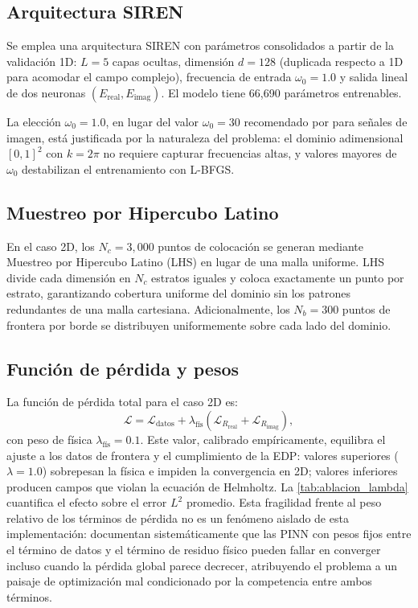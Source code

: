 \subsection{Arquitectura SIREN}
\label{subsec:arquitectura}

Se emplea una arquitectura SIREN con parámetros consolidados a partir de la validación 1D:
$L = 5$ capas ocultas, dimensión $d = 128$ (duplicada respecto a 1D para acomodar el
campo complejo), frecuencia de entrada $\omega_0 = 1.0$ y salida lineal de dos
neuronas $(E_{\mathrm{real}}, E_{\mathrm{imag}})$.
El modelo tiene 66{,}690 parámetros entrenables.

La elección $\omega_0 = 1.0$, en lugar del valor $\omega_0 = 30$ recomendado por
\citet{Sitzmann2020_SIREN} para señales de imagen, está justificada por la naturaleza
del problema: el dominio adimensional $[0,1]^2$ con $k = 2\pi$ no requiere capturar
frecuencias altas, y valores mayores de $\omega_0$ destabilizan el entrenamiento con
L-BFGS.

\subsection{Muestreo por Hipercubo Latino}
\label{subsec:lhs}

En el caso 2D, los $N_c = 3{,}000$ puntos de colocación se generan mediante
Muestreo por Hipercubo Latino (LHS) \citep{Mckay1979_LHS} en lugar de una malla
uniforme.
LHS divide cada dimensión en $N_c$ estratos iguales y coloca exactamente un punto
por estrato, garantizando cobertura uniforme del dominio sin los patrones redundantes
de una malla cartesiana.
Adicionalmente, los $N_b = 300$ puntos de frontera por borde se distribuyen
uniformemente sobre cada lado del dominio.

\subsection{Función de pérdida y pesos}
\label{subsec:loss}

La función de pérdida total para el caso 2D es:
%
\begin{equation}
  \mathcal{L} = \mathcal{L}_{\mathrm{datos}}
              + \lambda_{\mathrm{fís}}\!\left(
                  \mathcal{L}_{R_{\mathrm{real}}} + \mathcal{L}_{R_{\mathrm{imag}}}
                \right),
  \label{eq:loss_2d}
\end{equation}
%
con peso de física $\lambda_{\mathrm{fís}} = 0.1$.
Este valor, calibrado empíricamente, equilibra el ajuste a los datos de frontera y
el cumplimiento de la EDP: valores superiores ($\lambda = 1.0$) sobrepesan la física
e impiden la convergencia en 2D; valores inferiores producen campos que violan la
ecuación de Helmholtz.
La \cref{tab:ablacion_lambda} cuantifica el efecto sobre el error $L^2$ promedio.
Esta fragilidad frente al peso relativo de los términos de pérdida no es un fenómeno
aislado de esta implementación: \citet{Krishnapriyan2021_failureModes} documentan
sistemáticamente que las PINN con pesos fijos entre el término de datos y el término de
residuo físico pueden fallar en converger incluso cuando la pérdida global parece
decrecer, atribuyendo el problema a un paisaje de optimización mal condicionado por la
competencia entre ambos términos.

